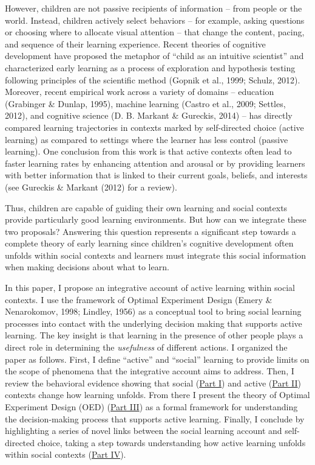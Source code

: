 \documentclass[oneside]{report}
\begin{document}
However, children are not passive recipients of information -- from
people or the world. Instead, children actively select behaviors -- for
example, asking questions or choosing where to allocate visual attention
-- that change the content, pacing, and sequence of their learning
experience. Recent theories of cognitive development have proposed the
metaphor of ``child as an intuitive scientist'' and characterized early
learning as a process of exploration and hypothesis testing following
principles of the scientific method (Gopnik et al., 1999; Schulz, 2012).
Moreover, recent empirical work across a variety of domains -- education
(Grabinger \& Dunlap, 1995), machine learning (Castro et al., 2009;
Settles, 2012), and cognitive science (D. B. Markant \& Gureckis, 2014)
-- has directly compared learning trajectories in contexts marked by
self-directed choice (active learning) as compared to settings where the
learner has less control (passive learning). One conclusion from this
work is that active contexts often lead to faster learning rates by
enhancing attention and arousal or by providing learners with better
information that is linked to their current goals, beliefs, and
interests (see Gureckis \& Markant (2012) for a review).

Thus, children are capable of guiding their own learning and social
contexts provide particularly good learning environments. But how can we
integrate these two proposals? Answering this question represents a
significant step towards a complete theory of early learning since
children's cognitive development often unfolds within social contexts
and learners must integrate this social information when making
decisions about what to learn.

In this paper, I propose an integrative account of active learning
within social contexts. I use the framework of Optimal Experiment Design
(Emery \& Nenarokomov, 1998; Lindley, 1956) as a conceptual tool to
bring social learning processes into contact with the underlying
decision making that supports active learning. The key insight is that
learning in the presence of other people plays a direct role in
determining the \emph{usefulness} of different actions. I organized the
paper as follows. First, I define ``active'' and ``social'' learning to
provide limits on the scope of phenomena that the integrative account
aims to address. Then, I review the behavioral evidence showing that
social (\protect\hyperlink{p1}{Part I}) and active
(\protect\hyperlink{p2}{Part II}) contexts change how learning unfolds.
From there I present the theory of Optimal Experiment Design (OED)
(\protect\hyperlink{p3}{Part III}) as a formal framework for
understanding the decision-making process that supports active learning.
Finally, I conclude by highlighting a series of novel links between the
social learning account and self-directed choice, taking a step towards
understanding how active learning unfolds within social contexts
(\protect\hyperlink{p4}{Part IV}).
\end{document}

